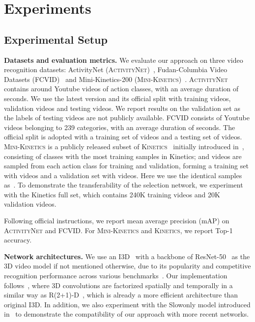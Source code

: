 \documentclass[final]{cvpr}
\newcommand{\anet}{{\scshape ActivityNet}\xspace}
\newcommand{\fcvid}{{\scshape FCVID}\xspace}
\newcommand{\minik}{{\scshape Mini-Kinetics}\xspace}
\newcommand{\kn}{{\scshape Kinetics}\xspace}
\begin{document}
\section{Experiments}

\subsection{Experimental Setup} \label{sec:exp_setup}
\noindent\textbf{Datasets and evaluation metrics.} We evaluate our approach on three video recognition datasets: ActivityNet (\anet)~\cite{anet}, Fudan-Columbia Video Datasets (\fcvid)~\cite{fcvid} and Mini-Kinetics-200 (\minik)~\cite{s3d}. \anet contains around  Youtube videos of  action classes, with an average duration of  seconds. We use the latest version  and its official split with  training videos,  validation videos and  testing videos. We report results on the validation set as the labels of testing videos are not publicly available. \fcvid consists of  Youtube videos belonging to 239  categories, with an average duration of  seconds. The official split is adopted with a training set of  videos and a testing set of  videos. \minik is a publicly released subset of \kn~\cite{quovadis} initially introduced in~\cite{s3d}, consisting of  classes with the most training samples in Kinetics;  and  videos are sampled from each action class for training and validation, forming a training set with  videos and a validation set with  videos. Here we use the identical samples as~\cite{s3d}. To demonstrate the transferability of the selection network, we experiment with the Kinetics full set, which contains 240K training videos and 20K validation videos.

Following official instructions, we report mean average precision (mAP) on \anet and \fcvid. For \minik and \kn, we report Top-1 accuracy.

\vspace{0.05in}
\noindent\textbf{Network architectures.} We use an I3D~\cite{quovadis} with a backbone of ResNet-50~\cite{resnet} as the 3D video model if not mentioned otherwise, due to its popularity and competitive recognition performance across various benchmarks~\cite{quovadis,sthsth,anet}. Our implementation follows~\cite{slowfast_repo}, where 3D convolutions are factorized spatially and temporally in a similar way as R(2+1)-D~\cite{r21d}, which is already a more efficient architecture than original I3D. In addition, we also experiment with the Slowonly model introduced in~\cite{slowfast} to demonstrate the compatibility of our approach with more recent networks.
\end{document}
